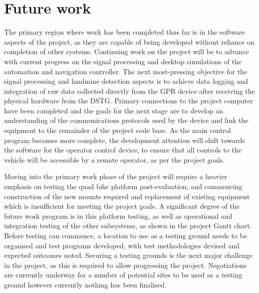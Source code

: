 \documentclass[main.tex]{subfiles}
\begin{document}
\section{Future work}


The primary region where work has been completed thus far is in the software aspects of the project, as they are capable of being developed without reliance on completion of other systems. Continuing work on the project will be to advance with current progress on the signal processing and desktop simulations of the automation and navigation controller. 
The next most-pressing objective for the signal processing and landmine detection aspects is to achieve data logging and integration of raw data collected directly from the GPR device after receiving the physical hardware from the DSTG. 
Primary connections to the project computer have been completed and the goals for the next stage are to develop an understanding of the communications protocols used by the device and link the equipment to the remainder of the project code base.
As the main control program becomes more complete, the development attention will shift towards the software for the operator control device, to ensure that all controls to the vehicle will be accessible by a remote operator, as per the project goals.

Moving into the primary work phase of the project will require a heavier emphasis on testing the quad bike platform post-evaluation, and commencing construction of the new mounts required and replacement of existing equipment which is insufficient for meeting the project goals. A significant degree of the future work program is in this platform testing, as well as operational and integration testing of the other subsystems, as shown in the project Gantt chart. 
Before testing can commence, a location to use as a testing ground needs to be organised and test programs developed, with test methodologies devised and expected outcomes noted. Securing a testing grounds is the next major challenge in the project, as this is required to allow progressing the project. 
Negotiations are currently underway for a number of potential sites to be used as a testing ground however currently nothing has been finalised.
\end{document}
